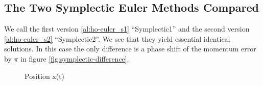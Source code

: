 \subsection{The Two Symplectic Euler Methods Compared} \label{app:symplectic_difference}
We call the first version \eqref{al:ho-euler_s1} ``Symplectic1'' and the second version \eqref{al:ho-euler_s2} ``Symplectic2''. We see that they yield essential identical solutions. In this case the only difference is a phase shift of the momentum error by $\pi$ in figure \ref{fig:symplectic-difference}.
\begin{figure}
    \centering
        \caption{Position x(t)}
\end{figure}

